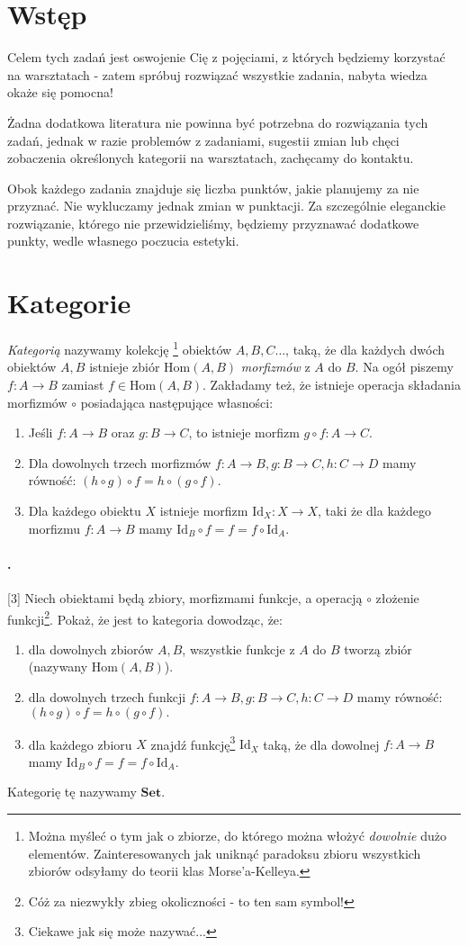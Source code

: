 \documentclass{article}
\newcounter{itemnum}
\newenvironment{prob}
{\stepcounter{itemnum}
\paragraph*{\arabic{itemnum}.}}
{~\newline}
\newcommand{\Hom}{\text{Hom}}
\newcommand{\Id}{\text{Id}}
\newcommand{\Set}{\textbf{Set}}
\begin{document}
\section{Wstęp}
  Celem tych zadań jest oswojenie Cię z pojęciami, z których będziemy korzystać na warsztatach - zatem spróbuj rozwiązać wszystkie zadania, nabyta wiedza okaże się pomocna!

  Żadna dodatkowa literatura nie powinna być potrzebna do rozwiązania tych zadań, jednak w razie problemów z zadaniami, sugestii zmian lub chęci zobaczenia określonych kategorii na warsztatach, zachęcamy do kontaktu.

  Obok każdego zadania znajduje się liczba punktów, jakie planujemy za nie przyznać. Nie wykluczamy jednak zmian w punktacji. Za szczególnie eleganckie rozwiązanie, którego nie przewidzieliśmy, będziemy przyznawać dodatkowe punkty, wedle własnego poczucia estetyki.

\section{Kategorie}
\emph{Kategorią} nazywamy kolekcję
\footnote{Można myśleć o tym jak o zbiorze, do którego można włożyć \emph{dowolnie} dużo elementów. Zainteresowanych jak uniknąć paradoksu zbioru wszystkich zbiorów odsyłamy do teorii klas Morse'a-Kelleya.}
obiektów $A, B, C\dots$, taką, że dla każdych dwóch obiektów $A, B$ istnieje zbiór $\Hom(A, B)$ \textit{morfizmów} z $A$ do $B$. Na ogół piszemy $f:A\to B$ zamiast $f\in \Hom(A,B)$. Zakładamy też, że istnieje operacja składania morfizmów $\circ$ posiadająca następujące własności:
\begin{enumerate}
  \item Jeśli $f:A\to B$ oraz $g: B\to C$, to istnieje morfizm $g\circ f: A\to C$.
  \item Dla dowolnych trzech morfizmów $f:A\to B, g:B\to C, h:C\to D$ mamy równość: $(h\circ g)\circ f = h\circ(g\circ f).$
  \item Dla każdego obiektu $X$ istnieje morfizm $\Id_X: X\to X$, taki że dla każdego morfizmu $f:A\to B$ mamy $\Id_B\circ f=f=f\circ\Id_A$.
\end{enumerate}

\begin{prob}
  [3] Niech obiektami będą zbiory, morfizmami funkcje, a operacją $\circ$ złożenie funkcji\footnote{Cóż za niezwykły zbieg okoliczności - to ten sam symbol!}. Pokaż, że
  jest to kategoria dowodząc, że:
  \begin{enumerate}
    \item dla dowolnych zbiorów $A, B$, wszystkie funkcje z $A$ do $B$ tworzą zbiór (nazywany $\Hom(A,B)$).
    \item dla dowolnych trzech funkcji $f:A\to B, g:B\to C, h:C\to D$ mamy równość: $(h\circ g)\circ f = h\circ(g\circ f).$
    \item dla każdego zbioru $X$ znajdź funkcję\footnote{Ciekawe jak się może nazywać...} $\Id_X$ taką, że dla dowolnej $f:A\to B$ mamy $\Id_B\circ f=f=f\circ\Id_A$.
  \end{enumerate}
  Kategorię tę nazywamy $\Set$.
\end{prob}
\end{document}
